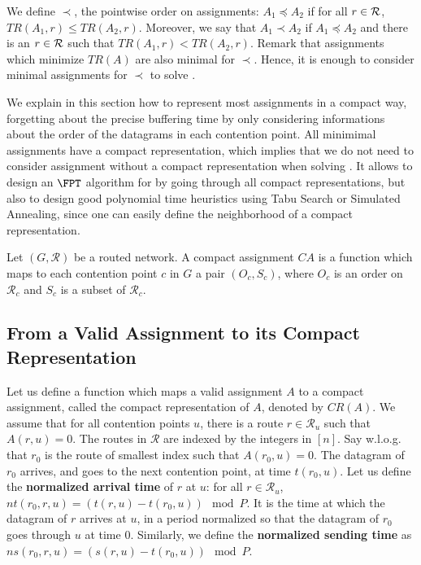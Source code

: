  We define $\prec$, the pointwise order on assignments: $A_1 \preceq A_2$ if for all $r\in {\cal R}$, $TR(A_1,r) \leq TR(A_2,r)$. Moreover, we say that $A_1 \prec A_2$ if $A_1 \preceq A_2$ and there is an $r \in \cal {R}$ such that  $TR(A_1,r) < TR(A_2,r)$. Remark that assignments which minimize $TR(A)$ are also minimal for $\prec$. Hence, it is enough to consider minimal assignments for $\prec$ to solve \minstra.

We explain in this section how to represent most assignments in a compact way, forgetting about the precise buffering time by only considering informations about the order of the datagrams in each contention point. All minimimal assignments have a compact representation, which implies that we do not need to consider assignment without a compact representation when solving \minstra. 
It allows to design an $\FPT$ algorithm for \minstra by going through all compact representations, but also to design good polynomial time heuristics using Tabu Search or Simulated Annealing, since one can easily define the neighborhood of a compact representation.


\begin{definition}
Let $(G, \mathcal{R})$ be a routed network. A compact assignment $CA$ is a function which maps to each contention point $c$ in $G$ a pair $(O_c,S_c)$, where $O_c$ is an order on $\mathcal{R}_c$ and $S_c$ is a subset of $\mathcal{R}_c$.
\label{definition:compact}
\end{definition}


\subsection{From a Valid Assignment to its Compact Representation}

Let us define a function which maps a valid assignment $A$ to a compact assignment, called the compact representation of $A$, denoted by $CR(A)$. We assume that for all contention points $u$, there is a route $r \in \mathcal{R}_u$ such that $A(r,u) = 0$. The routes in $\mathcal{R}$ are indexed by the integers in $[n]$. Say w.l.o.g. that $r_0$ is the route of smallest index such that $A(r_0,u) = 0$. The datagram of $r_0$ arrives, and goes to the next contention point, at time $t(r_0,u)$. Let us define the \textbf{normalized arrival time} of $r$ at $u$: for all $r \in \mathcal{R}_u$, $nt(r_0,r,u) = (t(r,u) - t(r_0,u)) \mod P$. It is the time at which the datagram of $r$ arrives at $u$, in a period normalized so that the datagram of $r_0$ goes through $u$ at time $0$. Similarly, we define the \textbf{normalized sending time} as $ns(r_0,r,u) = (s(r,u) - t(r_0,u)) \mod P$.

